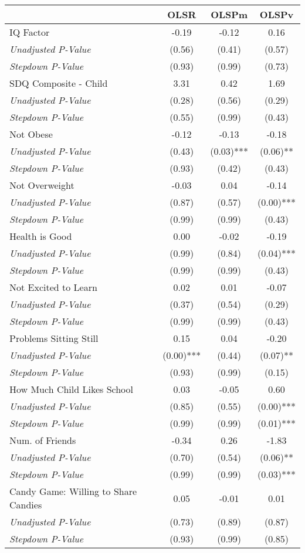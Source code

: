 \begin{tabular}{l c c c}
\toprule
 & OLSR & OLSPm & OLSPv \\
\midrule
IQ Factor & -0.19 & -0.12 & 0.16 \\
\quad \textit{Unadjusted P-Value} & (0.56) & (0.41) & (0.57) \\
\quad \textit{Stepdown P-Value} & (0.93) & (0.99) & (0.73) \\
SDQ Composite - Child & 3.31 & 0.42 & 1.69 \\
\quad \textit{Unadjusted P-Value} & (0.28) & (0.56) & (0.29) \\
\quad \textit{Stepdown P-Value} & (0.55) & (0.99) & (0.43) \\
Not Obese & -0.12 & -0.13 & -0.18 \\
\quad \textit{Unadjusted P-Value} & (0.43) & (0.03)*** & (0.06)** \\
\quad \textit{Stepdown P-Value} & (0.93) & (0.42) & (0.43) \\
Not Overweight & -0.03 & 0.04 & -0.14 \\
\quad \textit{Unadjusted P-Value} & (0.87) & (0.57) & (0.00)*** \\
\quad \textit{Stepdown P-Value} & (0.99) & (0.99) & (0.43) \\
Health is Good & 0.00 & -0.02 & -0.19 \\
\quad \textit{Unadjusted P-Value} & (0.99) & (0.84) & (0.04)*** \\
\quad \textit{Stepdown P-Value} & (0.99) & (0.99) & (0.43) \\
Not Excited to Learn & 0.02 & 0.01 & -0.07 \\
\quad \textit{Unadjusted P-Value} & (0.37) & (0.54) & (0.29) \\
\quad \textit{Stepdown P-Value} & (0.99) & (0.99) & (0.43) \\
Problems Sitting Still & 0.15 & 0.04 & -0.20 \\
\quad \textit{Unadjusted P-Value} & (0.00)*** & (0.44) & (0.07)** \\
\quad \textit{Stepdown P-Value} & (0.93) & (0.99) & (0.15) \\
How Much Child Likes School & 0.03 & -0.05 & 0.60 \\
\quad \textit{Unadjusted P-Value} & (0.85) & (0.55) & (0.00)*** \\
\quad \textit{Stepdown P-Value} & (0.99) & (0.99) & (0.01)*** \\
Num. of Friends & -0.34 & 0.26 & -1.83 \\
\quad \textit{Unadjusted P-Value} & (0.70) & (0.54) & (0.06)** \\
\quad \textit{Stepdown P-Value} & (0.99) & (0.99) & (0.03)*** \\
Candy Game: Willing to Share Candies & 0.05 & -0.01 & 0.01 \\
\quad \textit{Unadjusted P-Value} & (0.73) & (0.89) & (0.87) \\
\quad \textit{Stepdown P-Value} & (0.93) & (0.99) & (0.85) \\
\bottomrule
\end{tabular}
